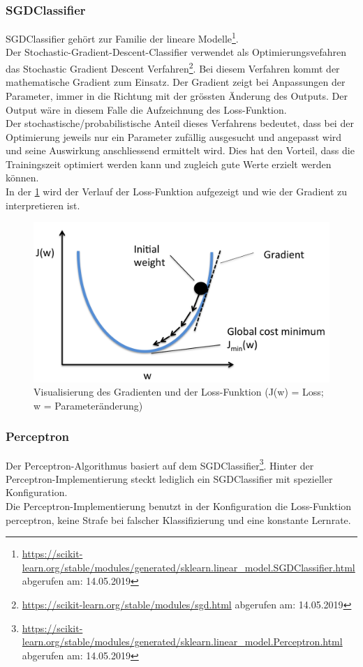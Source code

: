 \subsubsection{SGDClassifier}
SGDClassifier gehört zur Familie der lineare Modelle\footnote{\url{https://scikit-learn.org/stable/modules/generated/sklearn.linear_model.SGDClassifier.html} abgerufen am: 14.05.2019}\cite{scikit-learn}.\\
Der \glqq Stochastic-Gradient-Descent-Classifier\grqq{} verwendet als Optimierungsvefahren das \glqq Stochastic Gradient Descent\grqq{} Verfahren\footnote{\url{https://scikit-learn.org/stable/modules/sgd.html} abgerufen am: 14.05.2019}.
Bei diesem Verfahren kommt der mathematische Gradient zum Einsatz.
Der Gradient zeigt bei Anpassungen der Parameter, immer in die Richtung mit der grössten Änderung des Outputs.
Der Output wäre in diesem Falle die Aufzeichnung des Loss-Funktion.\\
Der stochastische/probabilistische Anteil dieses Verfahrens bedeutet, dass bei der Optimierung jeweils nur ein Parameter zufällig ausgesucht und angepasst wird und seine Auswirkung anschliessend ermittelt wird.
Dies hat den Vorteil, dass die Trainingszeit optimiert werden kann und zugleich gute Werte erzielt werden können\cite{lecun2012efficient}.\\
In der \cref{fig:sgd} wird der Verlauf der Loss-Funktion aufgezeigt und wie der Gradient zu interpretieren ist.
\begin{figure}[H]	
	\includegraphics[width=0.7\columnwidth,keepaspectratio]{img/sgd.png}
	\caption{Visualisierung des Gradienten und der Loss-Funktion (J(w) = Loss; w = Parameteränderung)}
	\label{fig:sgd}
\end{figure}
\subsubsection{Perceptron}
Der Perceptron-Algorithmus basiert auf dem SGDClassifier\footnote{\url{https://scikit-learn.org/stable/modules/generated/sklearn.linear_model.Perceptron.html} abgerufen am: 14.05.2019}\cite{scikit-learn}.
Hinter der Perceptron-Implementierung steckt lediglich ein SGDClassifier mit spezieller Konfiguration.\\
Die Perceptron-Implementierung benutzt in der Konfiguration die Loss-Funktion \glqq perceptron\grqq{}, keine Strafe bei falscher Klassifizierung und eine konstante Lernrate.
